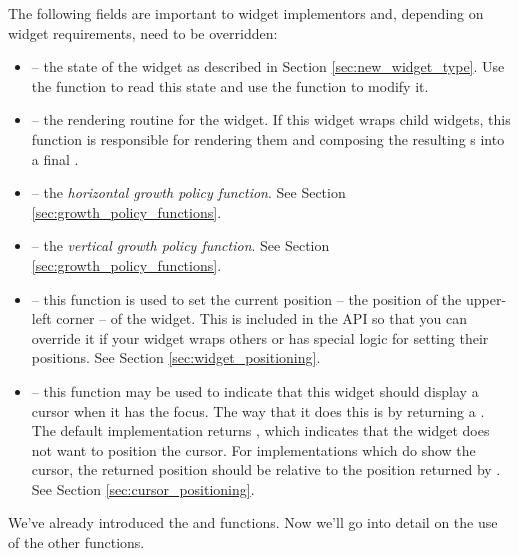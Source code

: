 The following fields are important to widget implementors and,
depending on widget requirements, need to be overridden:

\begin{itemize}
\item {} -- the state of the widget as described in Section
  \ref{sec:new_widget_type}.  Use the  function to read
  this state and use the  function to modify it.
\item {} -- the rendering routine for the widget.  If this
  widget wraps child widgets, this function is responsible for
  rendering them and composing the resulting s into a final
  .
\item {} -- the \textit{horizontal growth policy
  function}.  See Section \ref{sec:growth_policy_functions}.
\item {} -- the \textit{vertical growth policy
  function}.  See Section \ref{sec:growth_policy_functions}.
\item {} -- this function is used to set the
  current position -- the position of the upper-left corner -- of the
  widget.  This is included in the  API so that you can
  override it if your widget wraps others or has special logic for
  setting their positions.  See Section \ref{sec:widget_positioning}.
\item {} -- this function may be used to
  indicate that this widget should display a cursor when it has the
  focus.  The way that it does this is by returning a
  .  The default implementation returns
  , which indicates that the widget does not want to
  position the cursor.  For implementations which do show the cursor,
  the returned position should be relative to the position returned by
  .  See Section \ref{sec:cursor_positioning}.
\end{itemize}

We've already introduced the  and  functions.
Now we'll go into detail on the use of the other functions.
